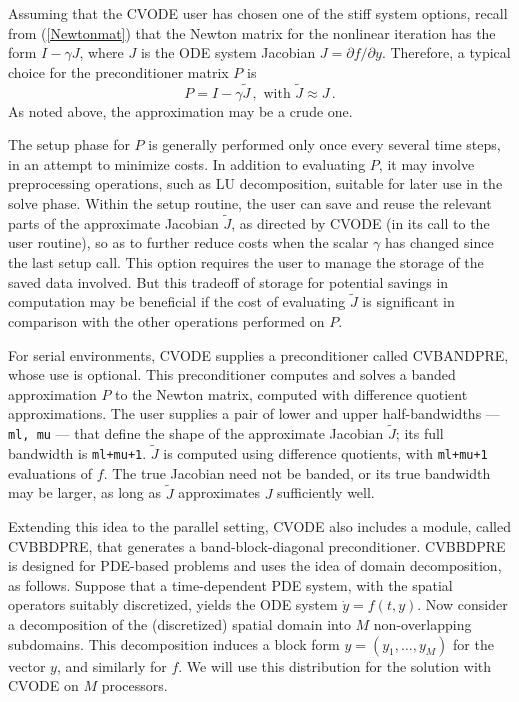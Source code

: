 Assuming that the CVODE user has chosen one of the stiff system
options, recall from (\ref{Newtonmat}) that the Newton matrix for
the nonlinear iteration has the form $I - \gamma J$, where $J$ is the
ODE system Jacobian $J = \partial f / \partial y$.  Therefore, a
typical choice for the preconditioner matrix $P$ is
\begin{equation*}
  P = I - \gamma \tilde{J} \, , \mbox{ with } \tilde{J} \approx J \, .
\end{equation*}
As noted above, the approximation may be a crude one.

The setup phase for $P$ is generally performed only once every several
time steps, in an attempt to minimize costs.  In addition to
evaluating $P$, it may involve preprocessing operations, such as LU
decomposition, suitable for later use in the solve phase.  Within the
setup routine, the user can save and reuse the relevant parts of the
approximate Jacobian $\tilde{J}$, as directed by CVODE (in its call to
the user routine), so as to further reduce costs when the scalar
$\gamma$ has changed since the last setup call.  This option requires the
user to manage the storage of the saved data involved.  But this
tradeoff of storage for potential savings in computation may be
beneficial if the cost of evaluating $\tilde{J}$ is significant in
comparison with the other operations performed on $P$.

For serial environments, CVODE supplies a preconditioner called
CVBANDPRE, whose use is optional.  This preconditioner computes
and solves a banded approximation $P$ to the Newton matrix,
computed with difference quotient approximations.  The user
supplies a pair of lower and upper half-bandwidths --- {\tt ml,
mu} --- that define the shape of the approximate Jacobian
$\tilde{J}$; its full bandwidth is {\tt ml+mu+1}.  $\tilde{J}$ is
computed using difference quotients, with {\tt ml+mu+1}
evaluations of $f$.  The true Jacobian need not be banded, or its
true bandwidth may be larger, as long as $\tilde{J}$ approximates
$J$ sufficiently well.

Extending this idea to the parallel setting, CVODE also includes a
module, called CVBBDPRE, that generates a band-block-diagonal
preconditioner.  CVBBDPRE is designed for PDE-based problems and uses the
idea of domain decomposition, as follows.  Suppose that a
time-dependent PDE system, with the spatial operators suitably
discretized, yields the ODE system $\dot{y} = f(t,y)$.  Now consider a
decomposition of the (discretized) spatial domain into $M$
non-overlapping subdomains.  This decomposition induces a block form
$y = (y_1,\ldots,y_M)$ for the vector $y$, and similarly for $f$.  We
will use this distribution for the solution with CVODE on $M$
processors.

